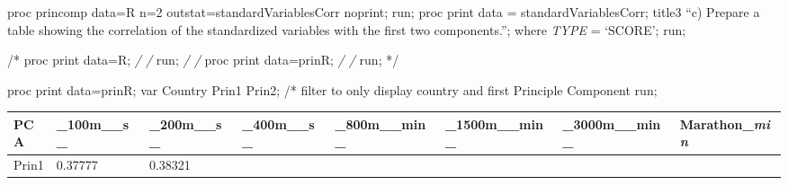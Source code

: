 \documentclass[11pt]{article}
\begin{document}
     proc princomp data=R n=2 outstat=standardVariablesCorr noprint; run;
proc print data = standardVariablesCorr; title3 ``c) Prepare a table
showing the correlation of the standardized variables with the first two
components.''; where \emph{TYPE} = `SCORE'; run;

/* proc print data=R; \emph{/ /} run; \emph{/ /} proc print data=prinR;
\emph{/ /} run; */

proc print data=prinR; var Country Prin1 Prin2; /* filter to only
display country and first Principle Component run; 

    \begin{longtable}[]{@{}llllllll@{}}
\toprule
\begin{minipage}[b]{0.10\columnwidth}\raggedright
PCA\strut
\end{minipage} & \begin{minipage}[b]{0.10\columnwidth}\raggedright
\_100m\_\_s\_\strut
\end{minipage} & \begin{minipage}[b]{0.10\columnwidth}\raggedright
\_200m\_\_s\_\strut
\end{minipage} & \begin{minipage}[b]{0.10\columnwidth}\raggedright
\_400m\_\_s\_\strut
\end{minipage} & \begin{minipage}[b]{0.10\columnwidth}\raggedright
\_800m\_\_min\_\strut
\end{minipage} & \begin{minipage}[b]{0.10\columnwidth}\raggedright
\_1500m\_\_min\_\strut
\end{minipage} & \begin{minipage}[b]{0.10\columnwidth}\raggedright
\_3000m\_\_min\_\strut
\end{minipage} & \begin{minipage}[b]{0.10\columnwidth}\raggedright
Marathon\_\emph{min}\strut
\end{minipage}\tabularnewline
\midrule
\endhead
\begin{minipage}[t]{0.10\columnwidth}\raggedright
Prin1\strut
\end{minipage} & \begin{minipage}[t]{0.10\columnwidth}\raggedright
0.37777\strut
\end{minipage} & \begin{minipage}[t]{0.10\columnwidth}\raggedright
0.38321\strut
\end{minipage} & \begin{minipage}[t]{0.10\columnwidth}\raggedright

\end{minipage}
\end{longtable}
\end{document}
